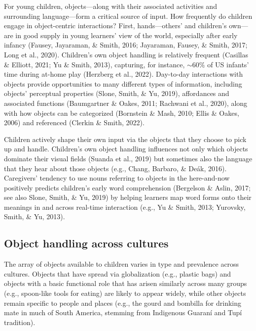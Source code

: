 \documentclass[10pt, letterpaper]{article}
\begin{document}
For young children, objects---along with their associated activities and
surrounding language---form a critical source of input. How frequently
do children engage in object-centric interactions? First,
hands---others' and children's own---are in good supply in young
learners' view of the world, especially after early infancy (Fausey,
Jayaraman, \& Smith, 2016; Jayaraman, Fausey, \& Smith, 2017; Long et
al., 2020). Children's own object handling is relatively frequent
(Casillas \& Elliott, 2021; Yu \& Smith, 2013), capturing, for instance,
\({\sim}60\%\) of US infants' time during at-home play (Herzberg et al.,
2022). Day-to-day interactions with objects provide opportunities to
many different types of information, including objects' perceptual
properties (Slone, Smith, \& Yu, 2019), affordances and associated
functions (Baumgartner \& Oakes, 2011; Rachwani et al., 2020), along
with how objects can be categorized (Bornstein \& Mash, 2010; Ellis \&
Oakes, 2006) and referenced (Clerkin \& Smith, 2022).

Children actively shape their own input via the objects that they choose
to pick up and handle. Children's own object handling influences not
only which objects dominate their visual fields (Suanda et al., 2019)
but sometimes also the language that they hear about those objects
(e.g., Chang, Barbaro, \& Deák, 2016). Caregivers' tendency to use nouns
referring to objects in the here-and-now positively predicts children's
early word comprehension (Bergelson \& Aslin, 2017; see also Slone,
Smith, \& Yu, 2019) by helping learners map word forms onto their
meanings in and across real-time interaction (e.g., Yu \& Smith, 2013;
Yurovsky, Smith, \& Yu, 2013).

\hypertarget{object-handling-across-cultures}{%
\subsection{Object handling across
cultures}\label{object-handling-across-cultures}}

The array of objects available to children varies in type and prevalence
across cultures. Objects that have spread via globalization (e.g.,
plastic bags) and objects with a basic functional role that has arisen
similarly across many groups (e.g., spoon-like tools for eating) are
likely to appear widely, while other objects remain specific to people
and places (e.g., the gourd and bombilla for drinking mate in much of
South America, stemming from Indigenous Guaraní and Tupí tradition).
\end{document}
